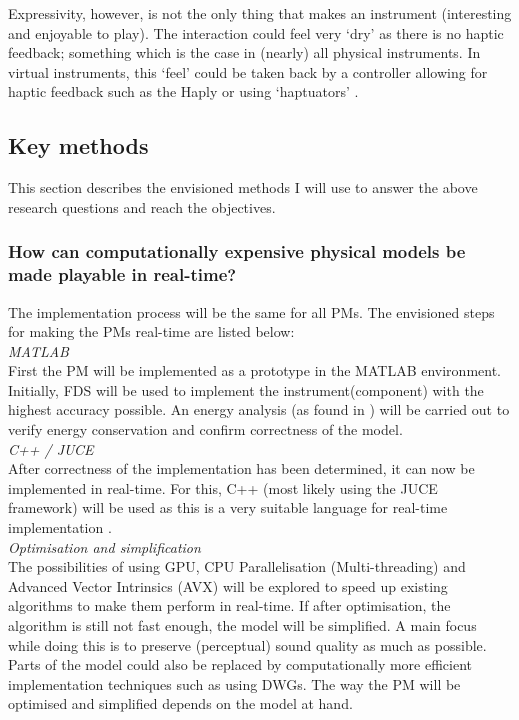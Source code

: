 Expressivity, however, is not the only thing that makes an instrument (interesting and enjoyable to play). The interaction could feel very `dry' as there is no haptic feedback; something which is the case in (nearly) all physical instruments. In virtual instruments, this `feel' could be taken back by a controller allowing for haptic feedback such as the Haply \cite{Haply2019} or using `haptuators' \cite{tactile2019}.

\subsection{Key methods}
This section describes the envisioned methods I will use to answer the above research questions and reach the objectives.

\subsubsection*{How can computationally expensive physical models be made playable in real-time?}
The implementation process will be the same for all PMs. The envisioned steps for making the PMs real-time are listed below:
\\

\noindent\textit{MATLAB}
\vspace{0.15cm}
\\
\noindent First the PM will be implemented as a prototype in the MATLAB environment. Initially, FDS will be used to implement the instrument(component) with the highest accuracy possible. An energy analysis (as found in \cite{Bilbao2009}) will be carried out to verify energy conservation and confirm correctness of the model.
\\

\noindent\textit{C++ / JUCE}
\vspace{0.15cm}
\\
\noindent 
After correctness of the implementation has been determined, it can now be implemented in real-time. For this, C++ (most likely using the JUCE framework) will be used as this is a very suitable language for real-time implementation \cite{Meyers2005}.
\\

\noindent\textit{Optimisation and simplification}
\vspace{0.15cm}
\\
\noindent 
The possibilities of using GPU, CPU Parallelisation (Multi-threading) and Advanced Vector Intrinsics (AVX) will be explored to speed up existing algorithms to make them perform in real-time. If after optimisation, the algorithm is still not fast enough, the model will be simplified. A main focus while doing this is to preserve (perceptual) sound quality as much as possible. Parts of the model could also be replaced by computationally more efficient implementation techniques such as using DWGs. The way the PM will be optimised and simplified depends on the model at hand. 

